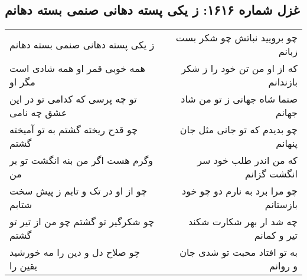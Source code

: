 \begin{center}
\section*{غزل شماره ۱۶۱۶: ز یکی پسته دهانی صنمی بسته دهانم}
\label{sec:1616}
\begin{longtable}{l p{0.5cm} r}
ز یکی پسته دهانی صنمی بسته دهانم
&&
چو برویید نباتش چو شکر بست زبانم
\\
همه خوبی قمر او همه شادی است مگر او
&&
که از او من تن خود را ز شکر بازندانم
\\
تو چه پرسی که کدامی تو در این عشق چه نامی
&&
صنما شاه جهانی ز تو من شاد جهانم
\\
چو قدح ریخته گشتم به تو آمیخته گشتم
&&
چو بدیدم که تو جانی مثل جان پنهانم
\\
وگرم هست اگر من بنه انگشت تو بر من
&&
که من اندر طلب خود سر انگشت گزانم
\\
چو از او در تک و تابم ز پیش سخت شتابم
&&
چو مرا برد به نارم دو چو خود بازستانم
\\
چو شکرگیر تو گشتم چو من از تیر تو گشتم
&&
چه شد ار بهر شکارت شکند تیر و کمانم
\\
چو صلاح دل و دین را مه خورشید یقین را
&&
به تو افتاد محبت تو شدی جان و روانم
\\
\end{longtable}
\end{center}
